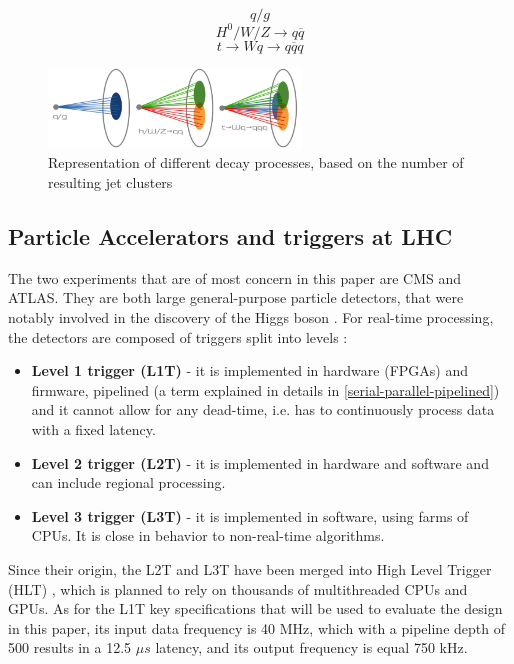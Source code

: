 \[ q / g \]
\[ H^0 / W / Z \rightarrow q\overline{q} \]
\[ t \rightarrow Wq \rightarrow q\overline{q}q \]

\begin{figure}[hpt!]
  \centering
  \includegraphics[trim={0cm 0cm 0cm 0cm}, width=0.6\textwidth, center]{background/jedi_jets.png}
  \caption{Representation of different decay processes, based on the number of resulting jet clusters}
  \label{fig:jedi-jets}
\end{figure}

\subsection{Particle Accelerators and triggers at LHC}
The two experiments that are of most concern in this paper are CMS and ATLAS. They are both large general-purpose particle detectors, that were notably involved in the discovery of the Higgs boson \cite{47-greeene2013higgs}. For real-time processing, the detectors are composed of triggers split into levels \citep[p.16]{48-trigger}:

\begin{itemize}
  \item \textbf{Level 1 trigger (L1T)} - it is implemented in hardware (FPGAs) and firmware, pipelined (a term explained in details in \autoref{serial-parallel-pipelined}) and it cannot allow for any dead-time, i.e. has to continuously process data with a fixed latency.
  \item \textbf{Level 2 trigger (L2T)} - it is implemented in hardware and software and can include regional processing.
  \item \textbf{Level 3 trigger (L3T)} - it is implemented in software, using farms of CPUs. It is close in behavior to non-real-time algorithms.
\end{itemize}

Since their origin, the L2T and L3T have been merged into High Level Trigger (HLT) \citep[p.47]{49-tappertriggering}, which is planned to rely on thousands of multithreaded CPUs and GPUs. As for the L1T key specifications that will be used to evaluate the design in this paper, its input data frequency is 40 MHz, which with a pipeline depth of 500 results in a 12.5 \(\mu s\) latency, and its output frequency is equal 750 kHz.